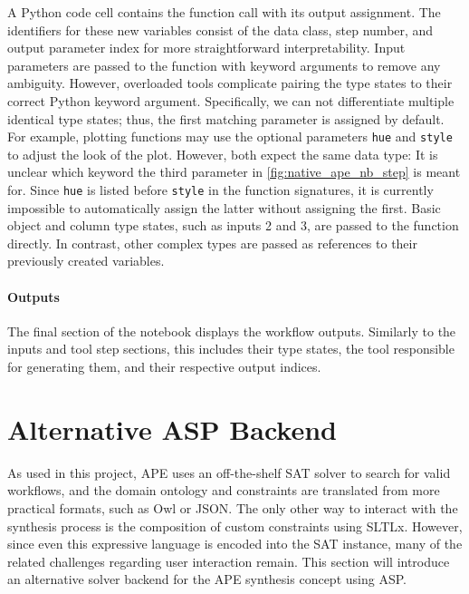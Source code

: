 A Python code cell contains the function call with its output assignment. The identifiers for these new variables consist of the data class, step number, and output parameter index for more straightforward interpretability. Input parameters are passed to the function with keyword arguments to remove any ambiguity. However, overloaded tools complicate pairing the type states to their correct Python keyword argument. Specifically, we can not differentiate multiple identical type states; thus, the first matching parameter is assigned by default. For example, plotting functions may use the optional parameters \verb|hue| and \verb|style| to adjust the look of the plot. However, both expect the same data type: It is unclear which keyword the third parameter in \autoref{fig:native_ape_nb_step} is meant for. Since \verb|hue| is listed before \verb|style| in the function signatures, it is currently impossible to automatically assign the latter without assigning the first. Basic object and column type states, such as inputs 2 and 3, are passed to the function directly. In contrast, other complex types are passed as references to their previously created variables.

\paragraph{Outputs}
The final section of the notebook displays the workflow outputs. Similarly to the inputs and tool step sections, this includes their type states, the tool responsible for generating them, and their respective output indices.

\section{Alternative ASP Backend}\label{sec:asp_backend}

As used in this project, APE uses an off-the-shelf SAT solver \cite{kasalica2022synthesis} to search for valid workflows, and the domain ontology and constraints are translated from more practical formats, such as Owl or JSON. The only other way to interact with the synthesis process is the composition of custom constraints using SLTLx. However, since even this expressive language is encoded into the SAT instance, many of the related challenges regarding user interaction remain. This section will introduce an alternative solver backend for the APE synthesis concept using ASP.

